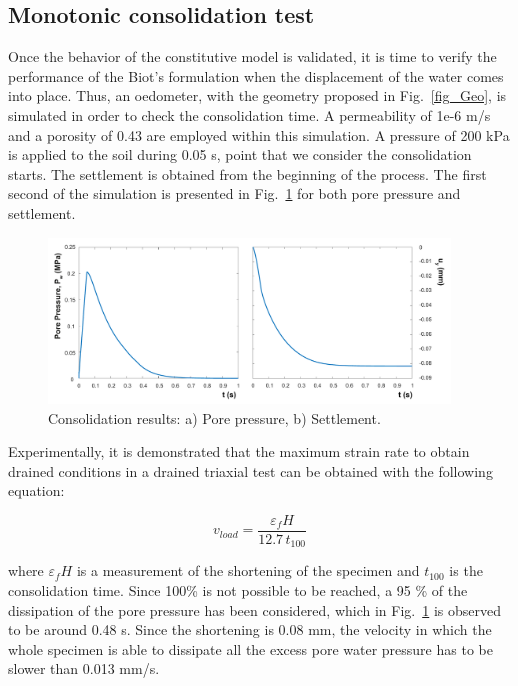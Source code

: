 \documentclass[preprint,12pt,a4paper]{elsarticle}
\begin{document}
\subsection{Monotonic consolidation test}
\label{sec:32}
Once the behavior of the constitutive model is validated, it is time to verify the performance of the Biot's formulation when the displacement of the water comes into place. Thus, an oedometer, with the geometry proposed in Fig.~\ref{fig_Geo}, is simulated in order to check the consolidation time. A permeability of 1e-6 m/s and a porosity of 0.43 are employed within this simulation. A pressure of 200 kPa is applied to the soil during 0.05 s, point that we consider the consolidation starts. The settlement is obtained from the beginning of the process. The first second of the simulation is presented in Fig.~\ref{fig_conso} for both pore pressure and settlement.
\begin{figure}
\centering
\includegraphics[width=0.95\textwidth]{Figs/conso.pdf}
\caption{Consolidation results: a) Pore pressure, b) Settlement.}
\label{fig_conso}
\end{figure}

Experimentally, it is demonstrated that the maximum strain rate to obtain drained conditions in a drained triaxial test can be obtained with the following equation:

\begin{equation}
v_{load}=\frac{\varepsilon_f H}{12.7 \, t_{100}}
\end{equation}

where $\varepsilon_f H$ is a measurement of the shortening of the specimen and $t_{100}$ is the consolidation time. Since 100\% is not possible to be reached, a 95 \% of the dissipation of the pore pressure has been considered, which in Fig.~\ref{fig_conso} is observed to be around 0.48 s. Since the shortening is 0.08 mm, the velocity in which the whole specimen is able to dissipate all the excess pore water pressure has to be slower than 0.013 mm/s.
\end{document}
